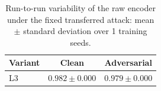 \begin{table}
\centering
\caption{Run-to-run variability of the raw encoder under the fixed transferred attack: mean $\pm$ standard deviation over 1 training seeds.}
\label{tab:multiseed}
\begin{tabular}{lcc}
\hline\hline
Variant & Clean & Adversarial \\
\hline
L3 & $0.982 \pm 0.000$ & $0.979 \pm 0.000$ \\
\hline
\end{tabular}
\end{table}
